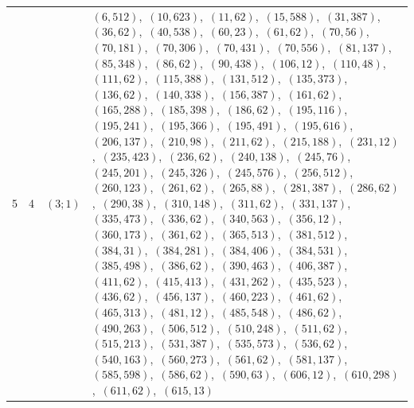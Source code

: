 \documentclass[11pt]{article}
\begin{document}
\begin{longtable}{@{}rrl>{\raggedright\arraybackslash}p{}@{}}
5 & 4 & $(3;1)$ & $(6,512)$,\allowbreak\ $(10,623)$,\allowbreak\ $(11,62)$,\allowbreak\ $(15,588)$,\allowbreak\ $(31,387)$,\allowbreak\ $(36,62)$,\allowbreak\ $(40,538)$,\allowbreak\ $(60,23)$,\allowbreak\ $(61,62)$,\allowbreak\ $(70,56)$,\allowbreak\ $(70,181)$,\allowbreak\ $(70,306)$,\allowbreak\ $(70,431)$,\allowbreak\ $(70,556)$,\allowbreak\ $(81,137)$,\allowbreak\ $(85,348)$,\allowbreak\ $(86,62)$,\allowbreak\ $(90,438)$,\allowbreak\ $(106,12)$,\allowbreak\ $(110,48)$,\allowbreak\ $(111,62)$,\allowbreak\ $(115,388)$,\allowbreak\ $(131,512)$,\allowbreak\ $(135,373)$,\allowbreak\ $(136,62)$,\allowbreak\ $(140,338)$,\allowbreak\ $(156,387)$,\allowbreak\ $(161,62)$,\allowbreak\ $(165,288)$,\allowbreak\ $(185,398)$,\allowbreak\ $(186,62)$,\allowbreak\ $(195,116)$,\allowbreak\ $(195,241)$,\allowbreak\ $(195,366)$,\allowbreak\ $(195,491)$,\allowbreak\ $(195,616)$,\allowbreak\ $(206,137)$,\allowbreak\ $(210,98)$,\allowbreak\ $(211,62)$,\allowbreak\ $(215,188)$,\allowbreak\ $(231,12)$,\allowbreak\ $(235,423)$,\allowbreak\ $(236,62)$,\allowbreak\ $(240,138)$,\allowbreak\ $(245,76)$,\allowbreak\ $(245,201)$,\allowbreak\ $(245,326)$,\allowbreak\ $(245,576)$,\allowbreak\ $(256,512)$,\allowbreak\ $(260,123)$,\allowbreak\ $(261,62)$,\allowbreak\ $(265,88)$,\allowbreak\ $(281,387)$,\allowbreak\ $(286,62)$,\allowbreak\ $(290,38)$,\allowbreak\ $(310,148)$,\allowbreak\ $(311,62)$,\allowbreak\ $(331,137)$,\allowbreak\ $(335,473)$,\allowbreak\ $(336,62)$,\allowbreak\ $(340,563)$,\allowbreak\ $(356,12)$,\allowbreak\ $(360,173)$,\allowbreak\ $(361,62)$,\allowbreak\ $(365,513)$,\allowbreak\ $(381,512)$,\allowbreak\ $(384,31)$,\allowbreak\ $(384,281)$,\allowbreak\ $(384,406)$,\allowbreak\ $(384,531)$,\allowbreak\ $(385,498)$,\allowbreak\ $(386,62)$,\allowbreak\ $(390,463)$,\allowbreak\ $(406,387)$,\allowbreak\ $(411,62)$,\allowbreak\ $(415,413)$,\allowbreak\ $(431,262)$,\allowbreak\ $(435,523)$,\allowbreak\ $(436,62)$,\allowbreak\ $(456,137)$,\allowbreak\ $(460,223)$,\allowbreak\ $(461,62)$,\allowbreak\ $(465,313)$,\allowbreak\ $(481,12)$,\allowbreak\ $(485,548)$,\allowbreak\ $(486,62)$,\allowbreak\ $(490,263)$,\allowbreak\ $(506,512)$,\allowbreak\ $(510,248)$,\allowbreak\ $(511,62)$,\allowbreak\ $(515,213)$,\allowbreak\ $(531,387)$,\allowbreak\ $(535,573)$,\allowbreak\ $(536,62)$,\allowbreak\ $(540,163)$,\allowbreak\ $(560,273)$,\allowbreak\ $(561,62)$,\allowbreak\ $(581,137)$,\allowbreak\ $(585,598)$,\allowbreak\ $(586,62)$,\allowbreak\ $(590,63)$,\allowbreak\ $(606,12)$,\allowbreak\ $(610,298)$,\allowbreak\ $(611,62)$,\allowbreak\ $(615,13)$\\

\end{longtable}
\end{document}
